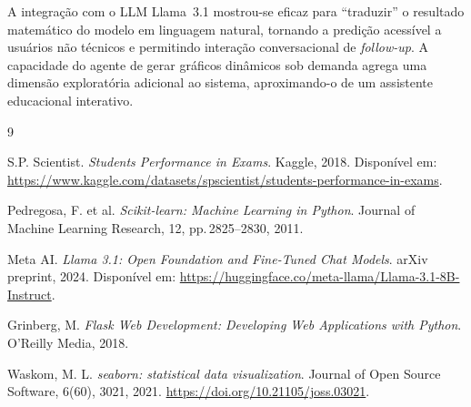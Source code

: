 \documentclass[12pt, a4paper]{article}
\begin{document}
A integração com o LLM Llama~3.1 mostrou-se eficaz para ``traduzir'' o
resultado matemático do modelo em linguagem natural, tornando a predição
acessível a usuários não técnicos e permitindo interação conversacional de
\textit{follow-up}. A capacidade do agente de gerar gráficos dinâmicos sob
demanda agrega uma dimensão exploratória adicional ao sistema, aproximando-o
de um assistente educacional interativo.

\newpage

\begin{thebibliography}{9}

  S.P. Scientist.
  \textit{Students Performance in Exams}.
  Kaggle, 2018.
  Disponível em:
  \url{https://www.kaggle.com/datasets/spscientist/students-performance-in-exams}.

  Pedregosa, F. et al.
  \textit{Scikit-learn: Machine Learning in Python}.
  Journal of Machine Learning Research, 12, pp.\,2825--2830, 2011.

  Meta AI.
  \textit{Llama 3.1: Open Foundation and Fine-Tuned Chat Models}.
  arXiv preprint, 2024.
  Disponível em:
  \url{https://huggingface.co/meta-llama/Llama-3.1-8B-Instruct}.

  Grinberg, M.
  \textit{Flask Web Development: Developing Web Applications with Python}.
  O'Reilly Media, 2018.

  Waskom, M. L.
  \textit{seaborn: statistical data visualization}.
  Journal of Open Source Software, 6(60), 3021, 2021.
  \url{https://doi.org/10.21105/joss.03021}.

\end{thebibliography}
\end{document}
